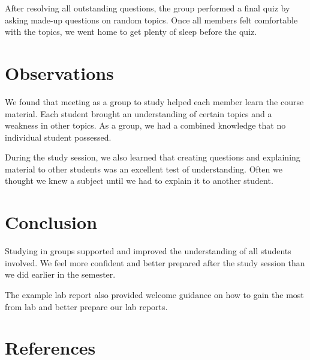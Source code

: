 \documentclass[12pt]{article}
\begin{document}
After resolving all outstanding questions, the group performed a final quiz by
asking made-up questions on random topics. Once all members felt comfortable
with the topics, we went home to get plenty of sleep before the quiz.

\section{Observations}

We found that meeting as a group to study helped each member learn the course
material. Each student brought an understanding of certain topics and a
weakness in other topics. As a group, we had a combined knowledge that no
individual student possessed.
\nocite{LOGISIM}

During the study session, we also learned that creating questions and explaining
material to other students was an excellent test of understanding. Often we
thought we knew a subject until we had to explain it to another student.

%

\section{Conclusion}

Studying in groups supported and improved the understanding of all students
involved. We feel more confident and better prepared after the study session
than we did earlier in the semester.

The example lab report also provided welcome guidance on how to gain the most
from lab and better prepare our lab reports.


\renewcommand*{\refname}{}
\section{References}
%
%


\end{document}
